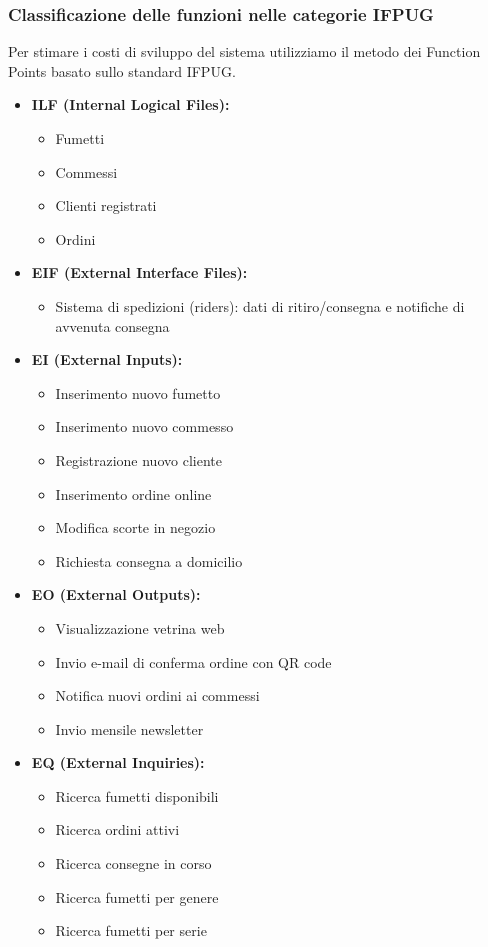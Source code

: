 \documentclass[12pt, a4paper]{article}
\begin{document}
\subsubsection{Classificazione delle funzioni nelle categorie IFPUG}
Per stimare i costi di sviluppo del sistema utilizziamo il metodo dei Function Points basato sullo standard IFPUG.
\begin{itemize}
  \item \textbf{ILF (Internal Logical Files):}  
    \begin{itemize}
      \item Fumetti
      \item Commessi 
      \item Clienti registrati 
      \item Ordini
    \end{itemize}

  \item \textbf{EIF (External Interface Files):}  
    \begin{itemize}
      \item Sistema di spedizioni (riders): dati di ritiro/consegna e notifiche di avvenuta consegna  
    \end{itemize}

  \item \textbf{EI (External Inputs):}  
    \begin{itemize}
      \item Inserimento nuovo fumetto  
      \item Inserimento nuovo commesso 
      \item Registrazione nuovo cliente 
      \item Inserimento ordine online   
      \item Modifica scorte in negozio
      \item Richiesta consegna a domicilio 
    \end{itemize}

  \item \textbf{EO (External Outputs):}  
    \begin{itemize}
      \item Visualizzazione vetrina web
      \item Invio e-mail di conferma ordine con QR code  
      \item Notifica nuovi ordini ai commessi 
      \item Invio mensile newsletter
    \end{itemize}
  \item \textbf{EQ (External Inquiries):}  
    \begin{itemize}
      \item Ricerca fumetti disponibili
      \item Ricerca ordini attivi
      \item Ricerca consegne in corso
      \item Ricerca fumetti per genere     
      \item Ricerca fumetti per serie 
    \end{itemize}
\end{itemize}
\end{document}
